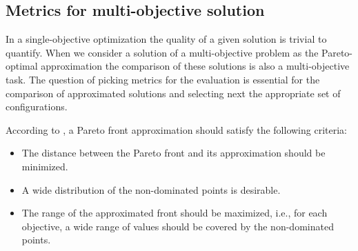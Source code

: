 


        \subsection{Metrics for multi-objective solution}
            In a single-objective optimization the quality of a given solution is trivial to quantify. When we consider a solution of a multi-objective problem as the Pareto-optimal approximation the comparison of these solutions is also a multi-objective task.
            The question of picking metrics for the evaluation is essential for the comparison of approximated solutions and selecting next the appropriate set of configurations.

            According to \cite{ZitzlerDT00}, a Pareto front approximation should satisfy the following criteria:
            \begin{itemize}
                \item The distance between the Pareto front and its approximation should be minimized.
                \item A wide distribution of the non-dominated points is desirable.
                \item The range of the approximated front should be maximized, i.e., for each objective, a wide range of values should be covered by the non-dominated points.
            \end{itemize}

